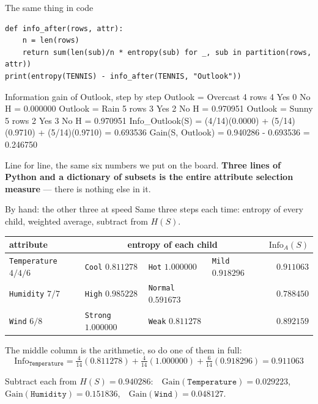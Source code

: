 \documentclass[aspectratio=169]{beamer}
\begin{document}
\begin{frame}[fragile,shrink=6]{The same thing in code}
\begin{lstlisting}
def info_after(rows, attr):
    n = len(rows)
    return sum(len(sub)/n * entropy(sub) for _, sub in partition(rows, attr))
print(entropy(TENNIS) - info_after(TENNIS, "Outlook"))
\end{lstlisting}
\begin{outblk}
Information gain of Outlook, step by step
   Outlook = Overcast    4 rows  4 Yes 0 No   H = 0.000000
   Outlook = Rain        5 rows  3 Yes 2 No   H = 0.970951
   Outlook = Sunny       5 rows  2 Yes 3 No   H = 0.970951
   Info_Outlook(S) = (4/14)(0.0000) + (5/14)(0.9710) + (5/14)(0.9710)
                   = 0.693536
   Gain(S, Outlook) = 0.940286 - 0.693536 = 0.246750
\end{outblk}
\begin{center}\small
  Line for line, the same six numbers we put on the board. \textbf{Three
  lines of Python and a dictionary of subsets is the entire attribute
  selection measure} --- there is nothing else in it.
\end{center}
\end{frame}

\begin{frame}[shrink=10]{By hand: the other three at speed}
Same three steps each time: entropy of every child, weighted average,
subtract from $H(S)$.
\begin{center}\small
\begin{tabular}{@{}l l l l r@{}}
  \toprule
  attribute & \multicolumn{3}{c}{entropy of each child} &
    $\mathrm{Info}_A(S)$\\
  \midrule
  \texttt{Temperature} $4/4/6$ & \texttt{Cool} $0.811278$
    & \texttt{Hot} $1.000000$ & \texttt{Mild} $0.918296$ & $0.911063$\\
  \texttt{Humidity} $7/7$ & \texttt{High} $0.985228$
    & \texttt{Normal} $0.591673$ & & $0.788450$\\
  \texttt{Wind} $6/8$ & \texttt{Strong} $1.000000$
    & \texttt{Weak} $0.811278$ & & $0.892159$\\
  \bottomrule
\end{tabular}
\end{center}
The middle column is the arithmetic, so do one of them in full:
\[
  \mathrm{Info}_{\texttt{Temperature}}
    = \tfrac{4}{14}(0.811278) + \tfrac{4}{14}(1.000000)
    + \tfrac{6}{14}(0.918296) = 0.911063
\]
\begin{center}
  Subtract each from $H(S) = 0.940286$:\ \
  $\mathrm{Gain}(\texttt{Temperature}) = \mathbf{0.029223}$,\ \
  $\mathrm{Gain}(\texttt{Humidity}) = \mathbf{0.151836}$,\ \
  $\mathrm{Gain}(\texttt{Wind}) = \mathbf{0.048127}$.
\end{center}
\end{frame}
\end{document}
